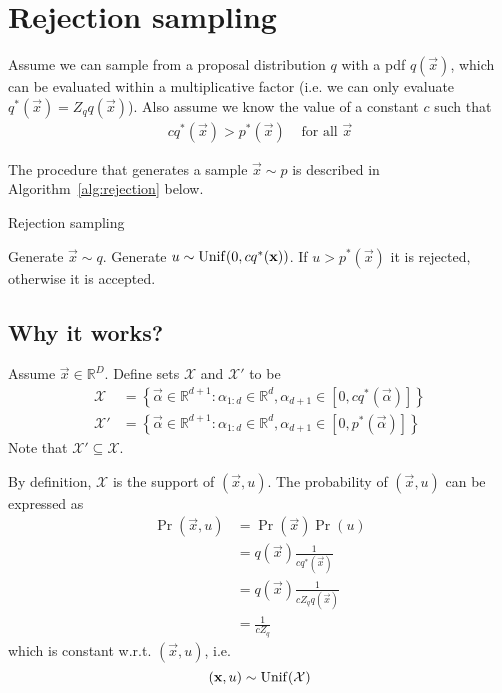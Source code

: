 \section{Rejection sampling}

Assume we can sample from a proposal distribution $q$ with a pdf $q(\vec x)$, which can be evaluated within a multiplicative factor (i.e. we can only evaluate $q^\ast(\vec x) = Z_q q(\vec x)$). Also assume we know the value of a constant $c$ such that
\begin{align}
    c q^\ast(\vec x) > p^\ast(\vec x) & \text{ for all } \vec x
\end{align}

The procedure that generates a sample $\vec x \sim p$ is described in Algorithm~\ref{alg:rejection} below.
\begin{algorithm}
\caption{Rejection sampling}\label{alg:rejection}
    \begin{algorithmic}[1]
        \State Generate $\vec x \sim q$.
        \State Generate $u \sim \operatorname{Unif}(0, c q^\ast(\boldsymbol{\mathbf{x}}))$.
        \State If $u > p^\ast(\vec x)$ it is rejected, otherwise it is accepted.
    \end{algorithmic}
\end{algorithm}


\subsection{Why it works?}
    Assume $\vec x \in \mathbb R^D$. Define sets $\mathcal X$ and $\mathcal X'$ to be
    \begin{align}
        \mathcal X &= \left\{\vec \alpha \in \mathbb R^{d + 1}: \alpha_{1:d} \in \mathbb R^d, \alpha_{d + 1} \in [0, c q^\ast(\vec \alpha)]\right\} \\
        \mathcal X' &= \left\{\vec \alpha \in \mathbb R^{d + 1}: \alpha_{1:d} \in \mathbb R^d, \alpha_{d + 1} \in [0, p^\ast(\vec \alpha)]\right\}
    \end{align}
    Note that $\mathcal X' \subseteq \mathcal X$.

    By definition, $\mathcal X$ is the support of $(\vec x, u)$. The probability of $(\vec x, u)$ can be expressed as
    \begin{align}
        \Pr(\vec x, u)  &= \Pr(\vec x) \Pr(u) \\
                        &= q(\vec x) \frac{1}{c q^\ast(\vec x)} \\
                        &= q(\vec x) \frac{1}{c Z_q q(\vec x)} \\
                        &= \frac{1}{c Z_q}
    \end{align}
    which is constant w.r.t. $(\vec x, u)$, i.e.
    \begin{equation}
        (\boldsymbol{\mathbf{x}}, u) \sim \operatorname{Unif}(\mathcal X)
    \end{equation}

